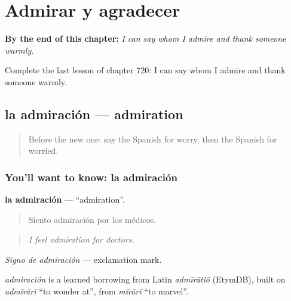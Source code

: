 
\chapter{Admirar y agradecer}
\label{ch:es-admirar-y-agradecer}

\begin{chapteropening}
\textbf{By the end of this chapter:} \emph{I can say whom I admire and thank someone warmly.}

Complete the last lesson of chapter 720: I can say whom I admire and thank someone warmly.
\end{chapteropening}

\section[la admiración]{la admiración — admiration}

\label{lesson:ES-C720-admiracion}



\begin{quote}
Before the new one: say the Spanish for worry, then the Spanish for worried.
\end{quote}

\subsection*{You'll want to know: la admiración}
\textbf{la admiración} — \textquotedblleft{}admiration\textquotedblright{}.

\begin{quote}
Siento admiración por los médicos.
\end{quote}

\begin{quote}
\emph{I feel admiration for doctors.}
\end{quote}

\emph{Signo de admiración} — exclamation mark.

\begin{cousinweb}
\emph{admiración} is a learned borrowing from Latin \emph{admīrātiō} (EtymDB), built on \emph{admīrārī} \textquotedblleft{}to wonder at\textquotedblright{}, from \emph{mīrārī} \textquotedblleft{}to marvel\textquotedblright{}.
\end{cousinweb}

